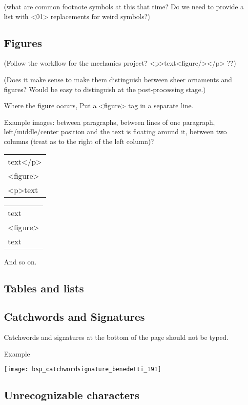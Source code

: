 (what are common footnote symbols at this that time? Do we need to provide a list with <01> replacements for weird symbols?)

\subsection{Figures}

(Follow the workflow for the mechanics project? <p>text<figure/></p> ??)

(Does it make sense to make them distinguish between sheer ornaments and figures? Would be easy to distinguish at the post-processing stage.)

Where the figure occurs, Put a <figure> tag in a separate line.

Example images: between paragraphs, between lines of one paragraph, left/middle/center position and the text is floating around it, between two columns (treat as to the right of the left column)?

\begin{tabular}{l}
text</p> \\
<figure> \\
<p>text \\
\end{tabular}

\begin{tabular}{l}
text \\
<figure> \\
text \\
\end{tabular}

And so on.

\subsection{Tables and lists}

\subsection{Catchwords and Signatures}

Catchwords and signatures at the bottom of the page should not be typed.

Example

\texttt{[image: bsp\_catchwordsignature\_benedetti\_191]} 


\subsection{Unrecognizable characters}


